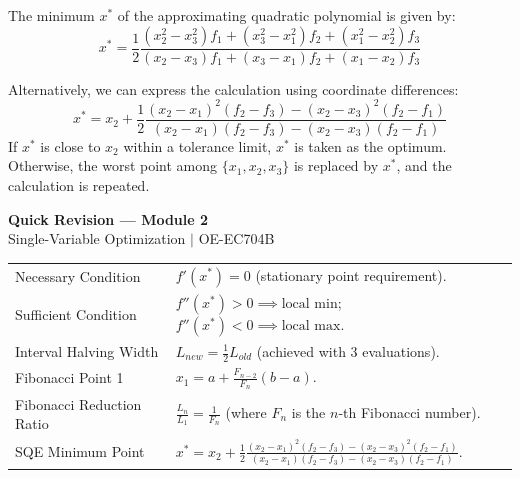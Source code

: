\documentclass[12pt,a4paper]{article}
\renewcommand{\arraystretch}{1.45}
\begin{document}
\begin{tcolorbox}[formulabox, title={SQE Minimum Point Formula}]
The minimum $x^*$ of the approximating quadratic polynomial is given by:
\begin{equation}
  x^* = \frac{1}{2} \frac{(x_2^2 - x_3^2)f_1 + (x_3^2 - x_1^2)f_2 + (x_1^2 - x_2^2)f_3}{(x_2 - x_3)f_1 + (x_3 - x_1)f_2 + (x_1 - x_2)f_3}
\end{equation}
\par\vspace{3pt}
Alternatively, we can express the calculation using coordinate differences:
\begin{equation}
  x^* = x_2 + \frac{1}{2} \frac{(x_2 - x_1)^2(f_2 - f_3) - (x_2 - x_3)^2(f_2 - f_1)}{(x_2 - x_1)(f_2 - f_3) - (x_2 - x_3)(f_2 - f_1)}
\end{equation}
If $x^*$ is close to $x_2$ within a tolerance limit, $x^*$ is taken as the optimum. Otherwise, the worst point among $\{x_1, x_2, x_3\}$ is replaced by $x^*$, and the calculation is repeated.
\end{tcolorbox}

\newpage

\begin{center}
  {\large\bfseries\color{myred} Quick Revision --- Module 2}\\[3pt]
  {\small\color{mydark} Single-Variable Optimization $|$ OE-EC704B}
\end{center}
\noindent{\color{myred}\rule{\linewidth}{1.2pt}}
\vspace{4pt}

\begin{tcolorbox}[formulabox, title={\textbf{Key Formulas \& Equations}}]
\renewcommand{\arraystretch}{1.45}
\begin{tabularx}{\linewidth}{B{5.0cm} X}
Necessary Condition & $f'(x^*) = 0$ \quad (stationary point requirement). \\[4pt]
Sufficient Condition & $f''(x^*) > 0 \implies \text{local min}$; $f''(x^*) < 0 \implies \text{local max}$. \\[4pt]
Interval Halving Width & $L_{new} = \frac{1}{2} L_{old}$ \quad (achieved with 3 evaluations). \\[4pt]
Fibonacci Point 1 & $x_1 = a + \frac{F_{n-2}}{F_n}(b-a)$. \\[4pt]
Fibonacci Reduction Ratio & $\frac{L_n}{L_1} = \frac{1}{F_n}$ \quad (where $F_n$ is the $n$-th Fibonacci number). \\[4pt]
SQE Minimum Point & $x^* = x_2 + \frac{1}{2} \frac{(x_2 - x_1)^2(f_2 - f_3) - (x_2 - x_3)^2(f_2 - f_1)}{(x_2 - x_1)(f_2 - f_3) - (x_2 - x_3)(f_2 - f_1)}$. \\
\end{tabularx}
\end{tcolorbox}
\end{document}
